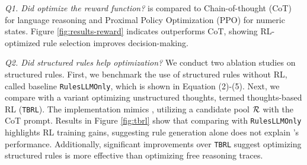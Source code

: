 \emph{Q1. Did \rbrl optimize the reward function?} \quad \rbrl is compared to Chain-of-thought (CoT) \cite{wei2022chain} for language reasoning and Proximal Policy Optimization (PPO) \cite{schulman2017proximal} for numeric states. Figure \ref{fig:results-reward} indicates \rbrl outperforms CoT, showing RL-optimized rule selection improves decision-making. 













\emph{Q2. Did structured rules help optimization?} \quad We conduct two ablation studies on structured rules. First, we benchmark the use of structured rules without RL, called baseline \texttt{RulesLLMOnly}, which is shown in Equation (2)-(5). Next, we compare \rbrl with a variant optimizing unstructured thoughts, termed thoughts-based RL (\texttt{TBRL}). The implementation mimics \rbrl, utilizing a candidate pool ${\mathcal{R}}$ with the CoT prompt. Results in Figure \ref{fig:tbrl} show that comparing \rbrl with \texttt{RulesLLMOnly} highlights RL training gains, suggesting rule generation alone does not explain \rbrl's performance. Additionally, significant improvements over \texttt{TBRL} suggest optimizing structured rules is more effective than optimizing free reasoning traces.



